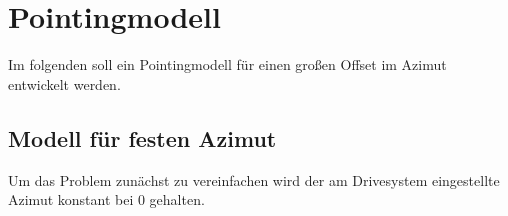 \chapter{Pointingmodell}
Im folgenden soll ein Pointingmodell für einen großen Offset im Azimut entwickelt werden.
\section{Modell für festen Azimut}
Um das Problem zunächst zu vereinfachen wird der am Drivesystem eingestellte Azimut konstant bei 0 gehalten.